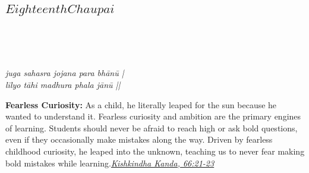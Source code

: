 
\newpage

\subsection*{ \(Eighteenth Chaupai\)}

\begin{minipage}[t]{0.55\textwidth}
\vspace{0pt}

{\large \linespread{1.5}\selectfont
{}\\
\par}

\vspace{0.5em}

{\large \linespread{1.5}\selectfont
{}\\
\par}

\vspace{0.5em}

{\large \linespread{1.3}\selectfont
\textit{juga sahasra jojana para bhānū |}\\
\textit{līlyo tāhi madhura phala jānū ||}
\par}
\end{minipage}%
\hfill
\begin{minipage}[t]{0.42\textwidth}
\vspace{0pt}
\begin{tcolorbox}[anchorbox]
\textbf{Fearless Curiosity:} As a child, he literally leaped for the sun because he wanted to understand it. Fearless curiosity and ambition are the primary engines of learning. Students should never be afraid to reach high or ask bold questions, even if they occasionally make mistakes along the way.
\vspace{0.5em}\newline Driven by fearless childhood curiosity, he leaped into the unknown, teaching us to never fear making bold mistakes while learning.\newline\null\hfill\href{https://www.valmiki.iitk.ac.in/sloka?field_kanda_tid=4&language=dv&field_sarga_value=66}{\textit{Kishkindha Kanda, 66:21-23}}
\end{tcolorbox}
\end{minipage}

